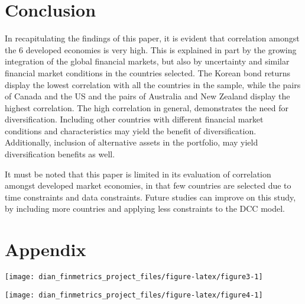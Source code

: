 \documentclass[11pt,preprint, authoryear]{elsarticle}
\let\origfigure\figure
\let\endorigfigure\endfigure
\renewenvironment{figure}[1][2] {
    \expandafter\origfigure\expandafter[H]
} {
    \endorigfigure
}
\numberwithin{equation}{section}
\numberwithin{figure}{section}
\numberwithin{table}{section}
\begin{document}
\newpage

\section{\texorpdfstring{Conclusion
\label{conclusion}}{Conclusion }}\label{conclusion}

In recapitulating the findings of this paper, it is evident that
correlation amongst the 6 developed economies is very high. This is
explained in part by the growing integration of the global financial
markets, but also by uncertainty and similar financial market conditions
in the countries selected. The Korean bond returns display the lowest
correlation with all the countries in the sample, while the pairs of
Canada and the US and the pairs of Australia and New Zealand display the
highest correlation. The high correlation in general, demonstrates the
need for diversification. Including other countries with different
financial market conditions and characteristics may yield the benefit of
diversification. Additionally, inclusion of alternative assets in the
portfolio, may yield diversification benefits as well.

It must be noted that this paper is limited in its evaluation of
correlation amongst developed market economies, in that few countries
are selected due to time constraints and data constraints. Future
studies can improve on this study, by including more countries and
applying less constraints to the DCC model.

\newpage

\section{\texorpdfstring{Appendix
\label{appendix}}{Appendix }}\label{appendix}

\begin{figure}[H]

{\centering \texttt{[image: dian\_finmetrics\_project\_files/figure-latex/figure3-1]} 

}

\caption{Dynanmic correlation \label{figure3}}\label{fig:figure3}
\end{figure}

\begin{figure}[H]

{\centering \texttt{[image: dian\_finmetrics\_project\_files/figure-latex/figure4-1]} 

}

\caption{Dynanmic correlation \label{figure4}}\label{fig:figure4}
\end{figure}
\end{document}
